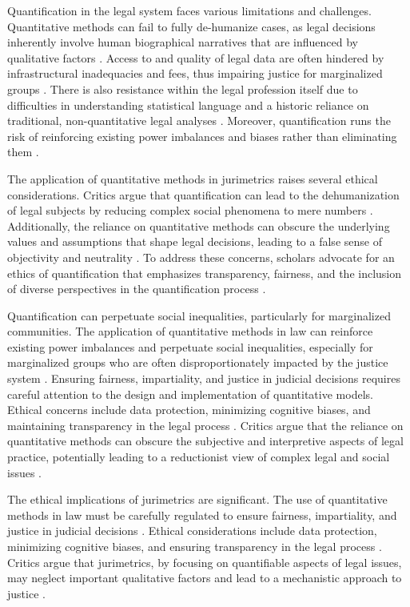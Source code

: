Quantification in the legal system faces various limitations and challenges. Quantitative methods can fail to fully de-humanize cases, as legal decisions inherently involve human biographical narratives that are influenced by qualitative factors \cite{lynch2019, lynch2019}. Access to and quality of legal data are often hindered by infrastructural inadequacies and fees, thus impairing justice for marginalized groups \cite{ribeiro2021}. There is also resistance within the legal profession itself due to difficulties in understanding statistical language and a historic reliance on traditional, non-quantitative legal analyses \cite{maia2019, ribeiro2021}. Moreover, quantification runs the risk of reinforcing existing power imbalances and biases rather than eliminating them \cite{lynch2019}.

The application of quantitative methods in jurimetrics raises several ethical considerations. Critics argue that quantification can lead to the dehumanization of legal subjects by reducing complex social phenomena to mere numbers \cite{101111lsi12334}. Additionally, the reliance on quantitative methods can obscure the underlying values and assumptions that shape legal decisions, leading to a false sense of objectivity and neutrality \cite{101057s4159902003965}. To address these concerns, scholars advocate for an ethics of quantification that emphasizes transparency, fairness, and the inclusion of diverse perspectives in the quantification process \cite{101007s1102402209481w}.

Quantification can perpetuate social inequalities, particularly for marginalized communities. The application of quantitative methods in law can reinforce existing power imbalances and perpetuate social inequalities, especially for marginalized groups who are often disproportionately impacted by the justice system \cite{10.1590/dados.2022.65.3.267,10.1057/s41599-020-00557-0}. Ensuring fairness, impartiality, and justice in judicial decisions requires careful attention to the design and implementation of quantitative models. Ethical concerns include data protection, minimizing cognitive biases, and maintaining transparency in the legal process \cite{silva2023role}. Critics argue that the reliance on quantitative methods can obscure the subjective and interpretive aspects of legal practice, potentially leading to a reductionist view of complex legal and social issues \cite{1023071190721}.

The ethical implications of jurimetrics are significant. The use of quantitative methods in law must be carefully regulated to ensure fairness, impartiality, and justice in judicial decisions \cite{silva2023role}. Ethical considerations include data protection, minimizing cognitive biases, and ensuring transparency in the legal process \cite{silva2023role}. Critics argue that jurimetrics, by focusing on quantifiable aspects of legal issues, may neglect important qualitative factors and lead to a mechanistic approach to justice \cite{ribeiro2021quantification}.

